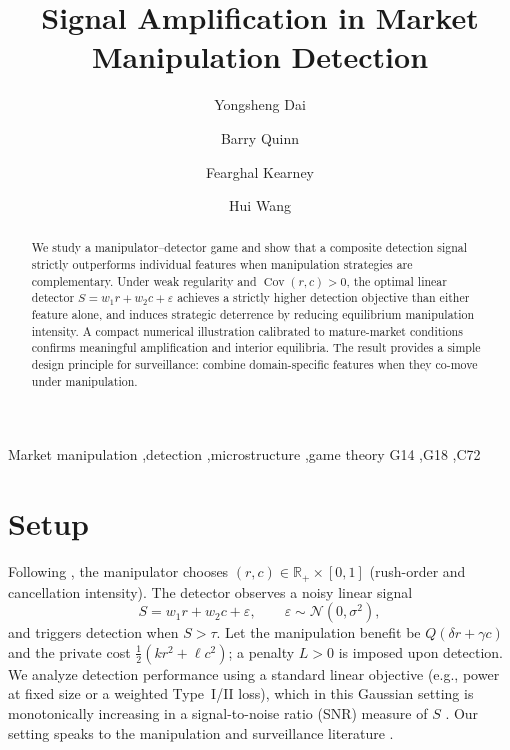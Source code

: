 \documentclass[preprint,12pt,authoryear]{elsarticle}
\begin{document}
\begin{frontmatter}

\title{Signal Amplification in Market Manipulation Detection}

\author[qub]{Yongsheng Dai}
\author[uu]{Barry Quinn}
\author[qbs]{Fearghal Kearney}
\author[qub]{Hui Wang}

\address[qub]{School of EEECS, Queen's University Belfast}
\address[uu]{Ulster University Business School, Ulster University}
\address[qbs]{Queen's Business School, Queen's University Belfast}

\begin{abstract}
We study a manipulator--detector game and show that a composite detection signal strictly outperforms individual features when manipulation strategies are complementary. Under weak regularity and $\operatorname{Cov}(r,c)>0$, the optimal linear detector $S=w_1 r + w_2 c + \varepsilon$ achieves a strictly higher detection objective than either feature alone, and induces strategic deterrence by reducing equilibrium manipulation intensity. A compact numerical illustration calibrated to mature-market conditions confirms meaningful amplification and interior equilibria. The result provides a simple design principle for surveillance: combine domain-specific features when they co-move under manipulation.
\end{abstract}

\begin{keyword}
Market manipulation \sep detection \sep microstructure \sep game theory
\JEL G14 \sep G18 \sep C72
\end{keyword}

\end{frontmatter}


\section{Setup}
Following \citet{vila1989simple}, the manipulator chooses $(r,c)\in\mathbb{R}_+\times[0,1]$ (rush-order and cancellation intensity). The detector observes a noisy linear signal
\begin{equation}
S=w_1 r + w_2 c + \varepsilon,\qquad \varepsilon\sim \mathcal{N}(0,\sigma^2),\label{eq:signal}
\end{equation}
and triggers detection when $S>\tau$. Let the manipulation benefit be $Q(\delta r + \gamma c)$ and the private cost $\tfrac{1}{2}(k r^2 + \ell c^2)$; a penalty $L>0$ is imposed upon detection. We analyze detection performance using a standard linear objective (e.g., power at fixed size or a weighted Type~I/II loss), which in this Gaussian setting is monotonically increasing in a signal-to-noise ratio (SNR) measure of $S$ \citep{kay1998fundamentals}. Our setting speaks to the manipulation and surveillance literature \citep{aggarwal2006stock,putnins2012market}.
\end{document}
